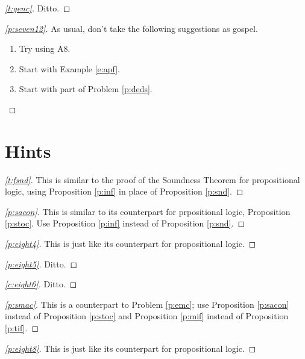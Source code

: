 \documentclass[12pt]{amsbook}
\theoremstyle{plain}
\theoremstyle{definition}
\theoremstyle{remark}
\newenvironment{clue}[1]%
{\begin{proof}[\ref{#1}]}%
{\renewcommand{\qed}{}\end{proof}}
\begin{document}
\begin{clue}{t:genc}
Ditto.
\end{clue}

\begin{clue}{p:seven12}
As usual,  don't take the following suggestions as gospel.
\begin{enumerate}
\item Try using A8.
\item Start with Example \ref{e:apf}.
\item Start with part of Problem \ref{p:deds}.
\end{enumerate}
\end{clue}



%
%

\chapter{Hints}

\begin{clue}{t:fsnd}
This is similar to the proof of the Soundness Theorem for propositional logic,  using Proposition \ref{p:inf} in place of Proposition \ref{p:snd}.
\end{clue}

\begin{clue}{p:sacon}
This is similar to its counterpart for prpositional logic,  Proposition \ref{p:stoc}.  Use Proposition \ref{p:inf} instead of Proposition \ref{p:snd}.
\end{clue}

\begin{clue}{p:eight4}
This is just like its counterpart for propositional logic.
\end{clue}

\begin{clue}{p:eight5}
Ditto.
\end{clue}

\begin{clue}{c:eight6}
Ditto.
\end{clue}

\begin{clue}{p:smac}
This is a counterpart to Problem \ref{p:emc};  use Proposition \ref{p:sacon} instead of Proposition \ref{p:stoc} and Proposition \ref{p:mif} instead of Proposition \ref{p:tif}.
\end{clue}

\begin{clue}{p:eight8}
This is just like its counterpart for propositional logic.
\end{clue}
\end{document}
